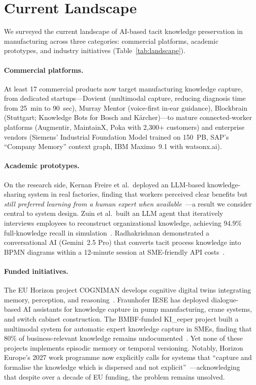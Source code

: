 \documentclass[]{ceurart}
\begin{document}
\section{Current Landscape}\label{sec:landscape}

We surveyed the current landscape of AI-based tacit knowledge
preservation in manufacturing across three categories: commercial
platforms, academic prototypes, and industry initiatives
(Table~\ref{tab:landscape}).

\paragraph{Commercial platforms.}
At least 17 commercial products now target manufacturing knowledge
capture, from dedicated startups---Dovient (multimodal capture, reducing
diagnosis time from 25~min to 90~sec), Murray Mentor (voice-first
in-ear guidance), Blockbrain (Stuttgart; Knowledge Bots for Bosch and
K\"archer)---to mature connected-worker platforms (Augmentir, MaintainX,
Poka with 2{,}300+ customers) and enterprise vendors (Siemens'
Industrial Foundation Model trained on 150~PB, SAP's ``Company Memory''
context graph, IBM Maximo~9.1 with watsonx.ai).

\paragraph{Academic prototypes.}
On the research side, Kernan Freire et al.\ deployed an LLM-based
knowledge-sharing system in real factories, finding that workers
perceived clear benefits but \emph{still preferred learning from a human
expert when available}~\cite{freire2024}---a result we consider central
to system design. Zuin et al.\ built an LLM agent that iteratively
interviews employees to reconstruct organizational knowledge, achieving
94.9\% full-knowledge recall in simulation~\cite{zuin2025}.
Radhakrishnan demonstrated a conversational AI (Gemini~2.5 Pro) that
converts tacit process knowledge into BPMN diagrams within a 12-minute
session at SME-friendly API costs~\cite{radhakrishnan2025}.

\paragraph{Funded initiatives.}
The EU Horizon project COGNIMAN develops cognitive digital twins
integrating memory, perception, and reasoning~\cite{cogniman2025}.
Fraunhofer IESE has deployed dialogue-based AI assistants for knowledge
capture in pump manufacturing, crane systems, and switch cabinet
construction. The BMBF-funded KI\_eeper project built a multimodal
system for automatic expert knowledge capture in SMEs, finding that 80\%
of business-relevant knowledge remains undocumented~\cite{kieeper2025}.
Yet none of these projects implements episodic memory or temporal
versioning. Notably, Horizon Europe's 2027 work programme now explicitly
calls for systems that ``capture and formalise the knowledge which is
dispersed and not explicit''~\cite{horizon2027}---acknowledging that
despite over a decade of EU funding, the problem remains unsolved.
\end{document}
